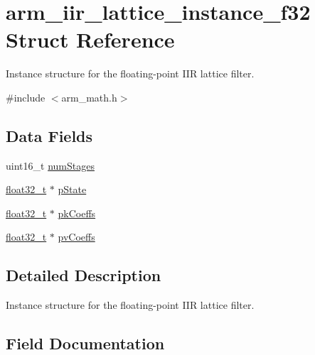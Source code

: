 \hypertarget{structarm__iir__lattice__instance__f32}{}\section{arm\+\_\+iir\+\_\+lattice\+\_\+instance\+\_\+f32 Struct Reference}
\label{structarm__iir__lattice__instance__f32}


Instance structure for the floating-\/point I\+IR lattice filter.  




{\ttfamily \#include $<$arm\+\_\+math.\+h$>$}

\subsection*{Data Fields}
\begin{DoxyCompactItemize}
\item 
uint16\+\_\+t \mbox{\hyperlink{structarm__iir__lattice__instance__f32_a4cceb90547b3e585d4c7aabaa8057212}{num\+Stages}}
\item 
\mbox{\hyperlink{arm__math_8h_a4611b605e45ab401f02cab15c5e38715}{float32\+\_\+t}} $\ast$ \mbox{\hyperlink{structarm__iir__lattice__instance__f32_a335c87e6fdc4b96601d95a5de8b9c463}{p\+State}}
\item 
\mbox{\hyperlink{arm__math_8h_a4611b605e45ab401f02cab15c5e38715}{float32\+\_\+t}} $\ast$ \mbox{\hyperlink{structarm__iir__lattice__instance__f32_a994889c5c4a866c50a0ee63326378816}{pk\+Coeffs}}
\item 
\mbox{\hyperlink{arm__math_8h_a4611b605e45ab401f02cab15c5e38715}{float32\+\_\+t}} $\ast$ \mbox{\hyperlink{structarm__iir__lattice__instance__f32_a0f8815744fade9c580d44277ff802308}{pv\+Coeffs}}
\end{DoxyCompactItemize}


\subsection{Detailed Description}
Instance structure for the floating-\/point I\+IR lattice filter. 

\subsection{Field Documentation}
\mbox{\label{structarm__iir__lattice__instance__f32_a4cceb90547b3e585d4c7aabaa8057212}} 

